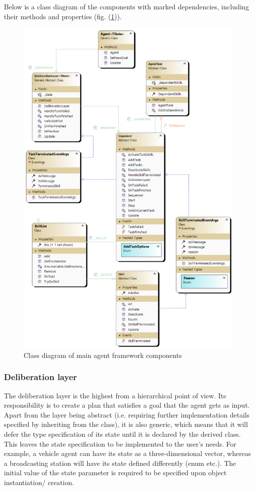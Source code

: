 \documentclass[main.tex]{subfiles}
\begin{document}
Below is a class diagram of the components with marked dependencies, including their methods and 
properties (fig. (\ref{mas-its-components})).


\begin{figure}[htbp]
    \centering
    \includegraphics[width=.9\textwidth]{MAS-ITS-Components.png}
    \caption{Class diagram of main agent framework components}
    \label{mas-its-components}
\end{figure}

\subsubsection{Deliberation layer}

The deliberation layer is the highest from a hierarchical point of view. Its responsibility is to 
create a plan that satisfies a goal that the agent gets as input. Apart from the layer 
being abstract (i.e. requiring further implementation details specified by inheriting from the 
class), it is also generic, which means that it will defer the type specification of its state until 
it is declared by the derived class. This leaves the state specification to be implemented 
to the user's needs. For example, a vehicle agent can have its state as a three-dimensional
vector, whereas a broadcasting station will have its state defined differently (enum etc.).
The initial value of the state parameter is required to be specified upon object instantiation/
creation.
\end{document}
